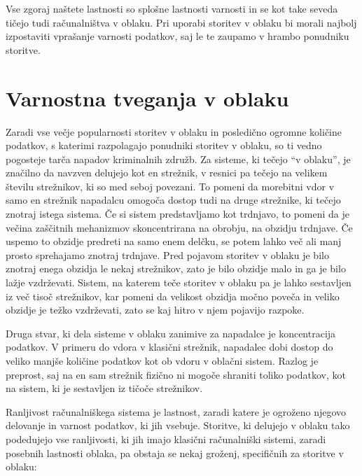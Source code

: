 \documentclass[12pt,a4paper,openany]{book}
\begin{document}
Vse zgoraj naštete lastnosti so splošne lastnosti varnosti in se kot take seveda tičejo tudi računalništva v oblaku. Pri uporabi storitev v oblaku bi morali najbolj izpostaviti vprašanje varnosti podatkov, saj le te zaupamo v hrambo ponudniku storitve.

\chapter{Varnostna tveganja v oblaku}

Zaradi vse večje popularnosti storitev v oblaku in posledično ogromne količine podatkov, s katerimi razpolagajo ponudniki storitev v oblaku, so ti vedno pogosteje tarča napadov kriminalnih združb. Za sisteme, ki tečejo “v oblaku”, je značilno da navzven delujejo kot en strežnik, v resnici pa tečejo na velikem številu strežnikov, ki so med seboj povezani. To pomeni da morebitni vdor v samo en strežnik napadalcu omogoča dostop tudi na druge strežnike, ki tečejo znotraj istega sistema. Če si sistem predstavljamo kot trdnjavo, to pomeni da je večina zaščitnih mehanizmov skoncentrirana na obrobju, na obzidju trdnjave. Če uspemo to obzidje predreti na samo enem delčku, se potem lahko več ali manj prosto sprehajamo znotraj trdnjave. Pred pojavom storitev v oblaku je bilo znotraj enega obzidja le nekaj strežnikov, zato je bilo obzidje malo in ga je bilo lažje vzdrževati. Sistem, na katerem teče storitev v oblaku pa je lahko sestavljen iz več tisoč strežnikov, kar pomeni da velikost obzidja močno poveča in veliko obzidje je težko vzdrževati, zato se kaj hitro v njem pojavijo razpoke.

Druga stvar, ki dela sisteme v oblaku zanimive za napadalce je koncentracija podatkov. V primeru do vdora v klasični strežnik, napadalec dobi dostop do veliko manjše količine podatkov kot ob vdoru v oblačni sistem. Razlog je preprost, saj na en sam strežnik fizično ni mogoče shraniti toliko podatkov, kot na sistem, ki je sestavljen iz tičoče strežnikov. 

Ranljivost računalniškega sistema je lastnost, zaradi katere je ogroženo njegovo delovanje in varnost podatkov, ki jih vsebuje. Storitve, ki delujejo v oblaku tako podedujejo vse ranljivosti, ki jih imajo klasični računalniški sistemi, zaradi posebnih lastnosti oblaka, pa obstaja se nekaj groženj, specifičnih za storitve v oblaku:
\end{document}
